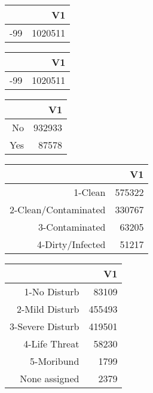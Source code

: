 \bigskip\bigskip
\centering
\begin{tabular}{rr}
  \hline
 & V1 \\ 
  \hline
-99 & 1020511 \\ 
   \hline
\end{tabular}

\bigskip\bigskip
\centering
\begin{tabular}{rr}
  \hline
 & V1 \\ 
  \hline
-99 & 1020511 \\ 
   \hline
\end{tabular}

\bigskip\bigskip
\centering
\begin{tabular}{rr}
  \hline
 & V1 \\ 
  \hline
No & 932933 \\ 
  Yes & 87578 \\ 
   \hline
\end{tabular}

\bigskip\bigskip
\centering
\begin{tabular}{rr}
  \hline
 & V1 \\ 
  \hline
1-Clean & 575322 \\ 
  2-Clean/Contaminated & 330767 \\ 
  3-Contaminated & 63205 \\ 
  4-Dirty/Infected & 51217 \\ 
   \hline
\end{tabular}

\bigskip\bigskip
\centering
\begin{tabular}{rr}
  \hline
 & V1 \\ 
  \hline
1-No Disturb & 83109 \\ 
  2-Mild Disturb & 455493 \\ 
  3-Severe Disturb & 419501 \\ 
  4-Life Threat & 58230 \\ 
  5-Moribund & 1799 \\ 
  None assigned & 2379 \\ 
   \hline
\end{tabular}

